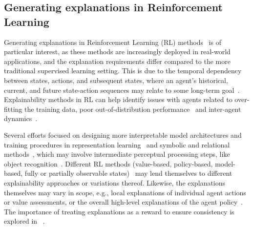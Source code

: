 \documentclass{article}
\begin{document}
\subsection{Generating explanations in Reinforcement Learning}
Generating explanations in Reinforcement Learning (RL) methods~\citep{alharin2020reinforcement, heuillet2020explainability, glanois2021survey, krajna2022explainability, vouros2022explainable, milani2022survey, dazeley2023explainable, omidshafiei2022beyond, das2023state2explanation} is of particular interest, as these methods are increasingly deployed in real-world applications, and the explanation requirements differ compared to the more traditional supervised learning setting. This is due to the temporal dependency between states, actions, and subsequent states, where an agent's historical, current, and future state-action sequences may relate to some long-term goal~\citep{dazeley2023explainable}. Explainability methods in RL can help identify issues with agents related to over-fitting the training data, poor out-of-distribution performance~\citep{annasamy2019towards} and inter-agent dynamics~\citep{omidshafiei2022beyond}.

Several efforts focused on designing more interpretable model architectures and training procedures in representation learning~\citep{raffin2019decoupling, raffin2018srl, 8852042, traore2019discorl, doncieux2020dream, openendedlearning} and symbolic and relational methods~\citep{sreedharan2020tldr, garnelo2016deep, garcez2018symbolic, zambaldi2018relational, hazra2023deep}, which may involve intermediate perceptual processing steps, like object recognition~\citep{goel2018unsupervised, li2018object}. 
Different RL methods (value-based, policy-based, model-based, fully or partially observable states)~\citep{alharin2020reinforcement} may lend themselves to different explainability approaches or variations thereof. 
Likewise, the explanations themselves may vary in scope, e.g., local explanations of individual agent actions or value assessments, or the overall high-level explanations of the agent policy~\citep{zrihem2016visualizing, sreedharan2020tldr, topin2021iterative}. 
The importance of treating explanations as a reward to ensure consistency is explored in ~\cite{yang2023leveraging}.
\end{document}

